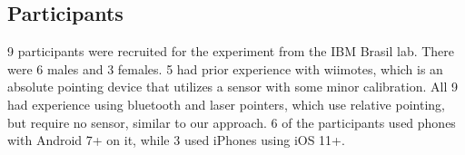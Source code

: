 \subsection{Participants}

9 participants were recruited for the experiment from the IBM Brasil lab. There
were 6 males and 3 females. 5 had prior experience with wiimotes, which is an
absolute pointing device that utilizes a sensor with some minor calibration. All
9 had experience using bluetooth and laser pointers, which use relative pointing,
but require no sensor, similar to our approach. 6 of the participants used
phones with Android 7+ on it, while 3 used iPhones using iOS 11+.